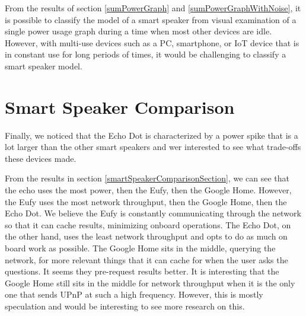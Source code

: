 From the results of section \ref{sumPowerGraph} and \ref{sumPowerGraphWithNoise}, it is possible to classify the model of a smart speaker from visual examination of a single power usage graph during a time when most other devices are idle. However, with multi-use devices such as a PC, smartphone, or IoT device that is in constant use for long periods of times, it would be challenging to classify a smart speaker model.

\section{Smart Speaker Comparison}
Finally, we noticed that the Echo Dot is characterized by a power spike that is a lot larger than the other smart speakers and wer interested to see what trade-offs these devices made.

From the results in section \ref{smartSpeakerComparisonSection}, we can see that the echo uses the most power, then the Eufy, then the Google Home. However, the Eufy uses the most network throughput, then the Google Home, then the Echo Dot. We believe the Eufy is constantly communicating through the network so that it can cache results, minimizing onboard operations. The Echo Dot, on the other hand, uses the least network throughput and opts to do as much on board work as possible. The Google Home sits in the middle, querying the network, for more relevant things that it can cache for when the user asks the questions. It seems they pre-request results better. It is interesting that the Google Home still sits in the middle for network throughput when it is the only one that sends UPnP at such a high frequency. However, this is mostly speculation and would be interesting to see more research on this.
